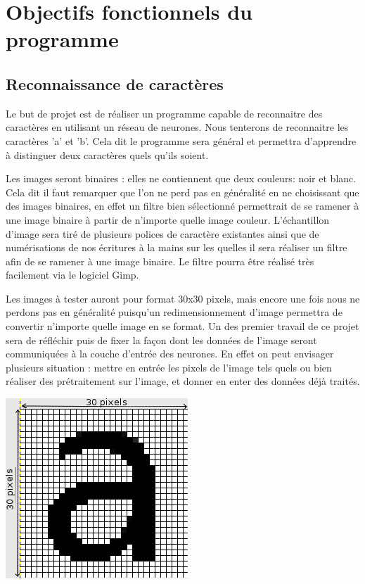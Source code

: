 \section{Objectifs fonctionnels du programme}

	\subsection{Reconnaissance de caractères}

Le but de projet est de réaliser un programme capable de reconnaitre des
caractères en utilisant un réseau de neurones. Nous tenterons de reconnaitre les
caractères 'a' et 'b'. Cela dit le programme sera général et permettra
d'apprendre à distinguer deux caractères quels qu'ils soient.

Les images seront binaires : elles ne contiennent que deux couleurs: noir et blanc. Cela dit il faut remarquer que l'on ne perd pas en généralité en ne choisissant que des images binaires, en effet un filtre bien sélectionn\'e permettrait de se ramener à une image binaire à partir de n'importe quelle image couleur. L’échantillon d'image sera tiré de plusieurs polices de caractère existantes ainsi que de numérisations de nos écritures à la mains sur les quelles il sera réaliser un filtre afin de se ramener à une image binaire. Le filtre pourra être réalisé très facilement via le logiciel
Gimp.

Les images \`a tester auront pour format 30x30 pixels, mais encore une fois nous ne perdons pas en généralité puisqu'un redimensionnement d'image permettra de convertir n'importe quelle image en se format. Un des premier travail de ce projet sera de réfléchir puis de fixer la façon dont les données de l'image seront communiquées à la couche d'entrée des neurones. En effet on peut envisager plusieurs situation : mettre en entrée les pixels de l'image tels quels ou bien réaliser des prétraitement sur l'image, et donner en enter des données déjà traités.

\begin{center}
	\includegraphics[width=0.66\linewidth]{img/char.png}
\end{center}

